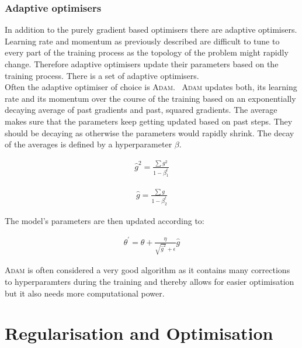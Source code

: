 \subsubsection{Adaptive optimisers}

In addition to the purely gradient based optimisers there are adaptive optimisers. Learning rate and momentum as previously described are difficult to tune to every part of the training process as the topology of the problem might rapidly change. Therefore adaptive optimisers update their parameters based on the training process. There is a set of adaptive optimisers.~\cite{chollet2015keras}\\
Often the adaptive optimiser of choice is \textsc{Adam}.~\cite{2014arXiv1412.6980K} \textsc{Adam} updates both, its learning rate and its momentum over the course of the training based on an exponentially decaying average of past gradients and past, squared gradients. The average makes sure that the parameters keep getting updated based on past steps. They should be decaying as otherwise the parameters would rapidly shrink. The decay of the averages is defined by a hyperparameter $\beta$.

\begin{align}
    \hat{g}^2 = \frac{\sum g^2}{1 - \beta_1^t}
\end{align}

\begin{align}
    \hat{g} = \frac{\sum g}{1 - \beta_2^t}
\end{align}

The model's parameters are then updated according to:

\begin{align}
    \theta^{\prime} = \theta + \frac{\eta}{\sqrt{\hat{g}^2} + \epsilon} \hat{g}
\end{align}

\textsc{Adam} is often considered a very good algorithm as it contains many corrections to hyperparamters during the training and thereby allows for easier optimisation but it also needs more computational power.


\section{Regularisation and Optimisation}

